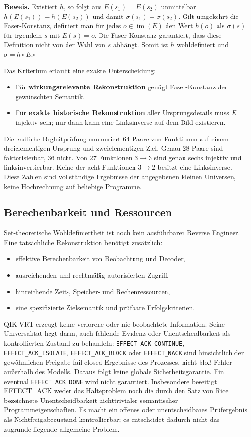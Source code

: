 \documentclass[11pt,a4paper]{article}
\newcommand{\DONE}{\texttt{EFFECT\_ACK\_DONE}}
\newcommand{\CONTINUE}{\texttt{EFFECT\_ACK\_CONTINUE}}
\newcommand{\BLOCK}{\texttt{EFFECT\_ACK\_BLOCK}}
\newcommand{\ISOLATE}{\texttt{EFFECT\_ACK\_ISOLATE}}
\newcommand{\NACK}{\texttt{EFFECT\_NACK}}
\begin{document}
\textbf{Beweis.} Existiert $h$, so folgt aus $E(s_1)=E(s_2)$ unmittelbar
$h(E(s_1))=h(E(s_2))$ und damit $\sigma(s_1)=\sigma(s_2)$. Gilt umgekehrt die
Faser-Konstanz, definiert man für jedes $o\in\operatorname{im}(E)$ den Wert
$h(o)$ als $\sigma(s)$ für irgendein $s$ mit $E(s)=o$. Die Faser-Konstanz
garantiert, dass diese Definition nicht von der Wahl von $s$ abhängt. Somit
ist $h$ wohldefiniert und $\sigma=h\circ E$.\hfill$\square$

Das Kriterium erlaubt eine exakte Unterscheidung:

\begin{itemize}
  \item Für \textbf{wirkungsrelevante Rekonstruktion} genügt
  Faser-Konstanz der gewünschten Semantik.
  \item Für \textbf{exakte historische Rekonstruktion} aller Ursprungsdetails
  muss $E$ injektiv sein; nur dann kann eine Linksinverse auf dem Bild
  existieren.
\end{itemize}

Die endliche Begleitprüfung enumeriert 64 Paare von Funktionen auf einem
dreielementigen Ursprung und zweielementigen Ziel. Genau 28 Paare sind
faktorisierbar, 36 nicht. Von 27 Funktionen $3\to3$ sind genau sechs injektiv
und linksinvertierbar. Keine der acht Funktionen $3\to2$ besitzt eine
Linksinverse. Diese Zahlen sind vollständige Ergebnisse der angegebenen
kleinen Universen, keine Hochrechnung auf beliebige Programme.

\subsection{Berechenbarkeit und Ressourcen}

Set-theoretische Wohldefiniertheit ist noch kein ausführbarer Reverse
Engineer. Eine tatsächliche Rekonstruktion benötigt zusätzlich:

\begin{itemize}
  \item effektive Berechenbarkeit von Beobachtung und Decoder,
  \item ausreichenden und rechtmäßig autorisierten Zugriff,
  \item hinreichende Zeit-, Speicher- und Rechenressourcen,
  \item eine spezifizierte Zielsemantik und prüfbare Erfolgskriterien.
\end{itemize}

QIK-VRT erzeugt keine verlorene oder nie beobachtete Information. Seine
Universalität liegt darin, auch fehlende Evidenz oder Unentscheidbarkeit als
kontrollierten Zustand zu behandeln: \CONTINUE{}, \ISOLATE{}, \BLOCK{} oder \NACK{}
sind hinsichtlich der gewöhnlichen Freigabe fail-closed Ergebnisse des
Prozesses, nicht bloß Fehler außerhalb des Modells. Daraus folgt keine globale
Sicherheitsgarantie. Ein eventual \DONE{} wird nicht garantiert.
Insbesondere beseitigt EFFECT\_ACK weder das Halteproblem noch die durch den
Satz von Rice bezeichnete Unentscheidbarkeit nichttrivialer semantischer
Programmeigenschaften. Es macht ein offenes oder unentscheidbares Prüfergebnis
als Nichtfreigabezustand kontrollierbar; es entscheidet dadurch nicht das
zugrunde liegende allgemeine Problem.
\end{document}
